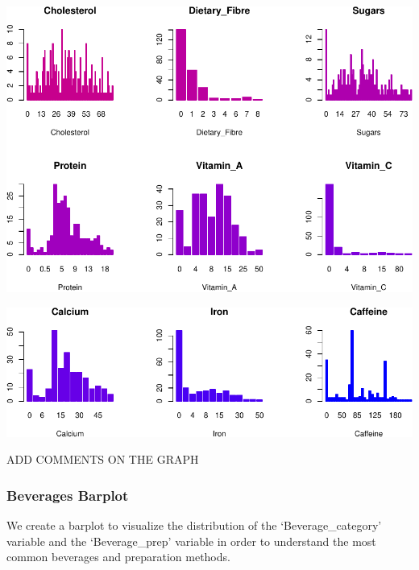 \documentclass[
]{article}
\newenvironment{Shaded}{\begin{snugshade}}{\end{snugshade}}
\newcommand{\AttributeTok}[1]{\textcolor[rgb]{0.13,0.29,0.53}{#1}}
\newcommand{\CommentTok}[1]{\textcolor[rgb]{0.56,0.35,0.01}{\textit{#1}}}
\newcommand{\DecValTok}[1]{\textcolor[rgb]{0.00,0.00,0.81}{#1}}
\newcommand{\FloatTok}[1]{\textcolor[rgb]{0.00,0.00,0.81}{#1}}
\newcommand{\FunctionTok}[1]{\textcolor[rgb]{0.13,0.29,0.53}{\textbf{#1}}}
\newcommand{\NormalTok}[1]{#1}
\newcommand{\SpecialCharTok}[1]{\textcolor[rgb]{0.81,0.36,0.00}{\textbf{#1}}}
\newcommand{\StringTok}[1]{\textcolor[rgb]{0.31,0.60,0.02}{#1}}
\begin{document}
\begin{center}\includegraphics{Statistical_Learning_Final_Report_files/figure-latex/barplot-2} \end{center}

\begin{center}\includegraphics{Statistical_Learning_Final_Report_files/figure-latex/barplot-3} \end{center}

ADD COMMENTS ON THE GRAPH

\subsubsection{Beverages Barplot}\label{beverages-barplot}

We create a barplot to visualize the distribution of the
`Beverage\_category' variable and the `Beverage\_prep' variable in order
to understand the most common beverages and preparation methods.

\begin{Shaded}
\end{Shaded}
\end{document}
